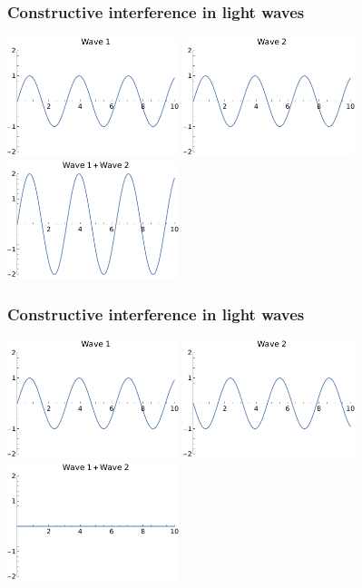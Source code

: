 \documentclass{beamer}
\begin{document}
\begin{frame}
  \frametitle{Constructive interference in light waves}
  \begin{center}
    \includegraphics[width=5cm]{wave1pres}
    \includegraphics[width=5cm]{wave2pres}
    \\
    \includegraphics[width=5cm]{constructivepres}
    \end{center}
  \end{frame}

\begin{frame}
  \frametitle{Constructive interference in light waves}
  \begin{center}
    \includegraphics[width=5cm]{wave1pres}
    \includegraphics[width=5cm]{wave3pres}
    \\
    \includegraphics[width=5cm]{destructivepres}
  \end{center}
\end{frame}
\end{document}
